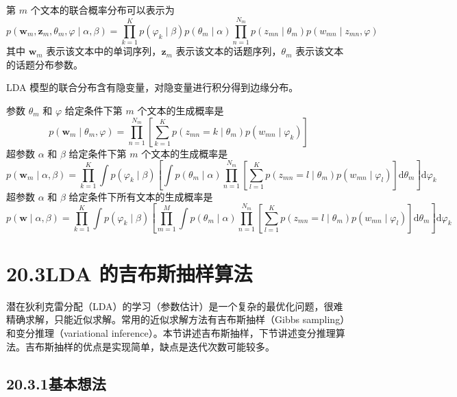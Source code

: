 \documentclass[UTF8,12pt,a4paper,fontset=fandol]{ctexart}
\begin{document}
第 $m$ 个文本的联合概率分布可以表示为
\begin{equation}
p(\mathbf{w}_m,\mathbf{z}_m,\theta_m,\varphi\mid\alpha,\beta)=\prod_{k=1}^K p(\varphi_k\mid\beta)p(\theta_m\mid\alpha)\prod_{n=1}^{N_m}p(z_{mn}\mid\theta_m)p(w_{mn}\mid z_{mn},\varphi)
\tag{20.16}
\end{equation}
其中 $\mathbf{w}_m$ 表示该文本中的单词序列，$\mathbf{z}_m$ 表示该文本的话题序列，$\theta_m$ 表示该文本的话题分布参数。

LDA 模型的联合分布含有隐变量，对隐变量进行积分得到边缘分布。

参数 $\theta_m$ 和 $\varphi$ 给定条件下第 $m$ 个文本的生成概率是
\begin{equation}
p(\mathbf{w}_m\mid\theta_m,\varphi)=\prod_{n=1}^{N_m}\left[\sum_{k=1}^K p(z_{mn}=k\mid\theta_m)p(w_{mn}\mid\varphi_k)\right]
\tag{20.17}
\end{equation}
超参数 $\alpha$ 和 $\beta$ 给定条件下第 $m$ 个文本的生成概率是
\begin{equation}
p(\mathbf{w}_m\mid\alpha,\beta)=\prod_{k=1}^K \int p(\varphi_k\mid\beta)\left[\int p(\theta_m\mid\alpha)\prod_{n=1}^{N_m}\left[\sum_{l=1}^K p(z_{mn}=l\mid\theta_m)p(w_{mn}\mid\varphi_l)\right]\mathrm{d}\theta_m\right]\mathrm{d}\varphi_k
\tag{20.18}
\end{equation}
超参数 $\alpha$ 和 $\beta$ 给定条件下所有文本的生成概率是
\begin{equation}
p(\mathbf{w}\mid\alpha,\beta)=\prod_{k=1}^K \int p(\varphi_k\mid\beta)\left[\prod_{m=1}^M \int p(\theta_m\mid\alpha)\prod_{n=1}^{N_m}\left[\sum_{l=1}^K p(z_{mn}=l\mid\theta_m)p(w_{mn}\mid\varphi_l)\right]\mathrm{d}\theta_m\right]\mathrm{d}\varphi_k
\tag{20.19}
\end{equation}

\section*{20.3\quad LDA 的吉布斯抽样算法}

潜在狄利克雷分配（LDA）的学习（参数估计）是一个复杂的最优化问题，很难精确求解，只能近似求解。常用的近似求解方法有吉布斯抽样（Gibbs sampling）和变分推理（variational inference）。本节讲述吉布斯抽样，下节讲述变分推理算法。吉布斯抽样的优点是实现简单，缺点是迭代次数可能较多。

\subsection*{20.3.1\quad 基本想法}
\end{document}
